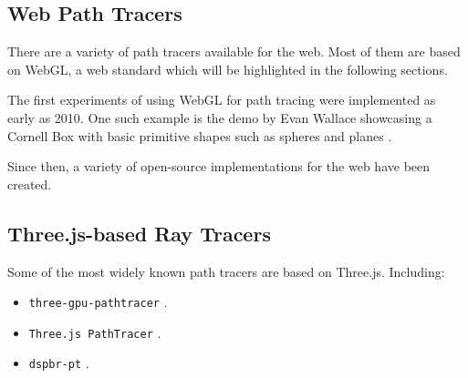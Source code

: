 \subsection{Web Path Tracers}

There are a variety of path tracers available for the web. Most of them are based on WebGL, a web standard which will be highlighted in the following sections.

The first experiments of using WebGL for path tracing were implemented as early as 2010. One such example is the demo by Evan Wallace showcasing a Cornell Box with basic primitive shapes such as spheres and planes \cite{pathTracerWallace}.

Since then, a variety of open-source implementations for the web have been created.

\subsection{Three.js-based Ray Tracers}

Some of the most widely known path tracers are based on Three.js. Including:

\begin{itemize}
    \item {\texttt{three-gpu-pathtracer}} \cite{ThreeJsPathTracerJohnson}.
    \item{\texttt{Three.js PathTracer}} \cite{ThreeJsPathTracerLoftis}.
    \item {\texttt{dspbr-pt}} \cite{PathTracerDassault}.
  \end{itemize}
